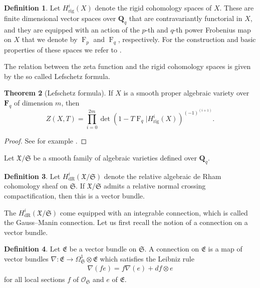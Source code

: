 \documentclass[a4paper,11pt]{article}
\numberwithin{equation}{section}
\newcommand{\QQ}{\mathbf{Q}} %
\newcommand{\FF}{\mathbf{F}} %
\DeclareMathOperator{\Frob}{F}           %
\providecommand{\HdR}{H_{\text{dR}}}    %
\providecommand{\Hrig}{H_{\text{rig}}}  %
\theoremstyle{definition}
\newtheorem{thm}{Theorem}[section]
\newtheorem{defn}[thm]{Definition}
\begin{document}
\begin{defn}
Let $\Hrig^{i}(X)$ denote the rigid
cohomology spaces of $X$. These are finite dimensional vector spaces over $\QQ_q$ 
that are contravariantly functorial in $X$, and they are equipped with an action of 
the $p$-th and $q$-th power Frobenius map on $X$ that we denote by $\Frob_p$ 
and $\Frob_q$, respectively. For the construction and basic properties of these spaces we 
refer to \cite{Berthelot1986}.
\end{defn}

The relation between the zeta function and the rigid cohomology spaces is given by the
so called Lefschetz formula.

\begin{thm}[Lefschetz formula] If $X$ is a smooth proper algebraic variety over $\FF_q$ of dimension $m$, 
then \label{thm:Lefschetz}
\[
Z(X,T) = \prod_{i=0}^{2m} \det(1- T \Frob_q | \Hrig^i(X))^{(-1)^{(i+1)}}.
\]
\end{thm}

\begin{proof}
See for example \cite[Theorem 6.3]{EtesseLeStum1993}.
\end{proof}

Let $\mathfrak{X}/\mathfrak{S}$ be a smooth family of algebraic varieties defined over $\QQ_q$.

\begin{defn}
Let $\HdR^i(\mathfrak{X}/\mathfrak{S})$ denote the relative algebraic de Rham cohomology sheaf  
on $\mathfrak{S}$. 
If $\mathfrak{X}/\mathfrak{S}$ admits a relative normal crossing compactification, then 
this is a vector bundle.
\end{defn}

The $\HdR^i(\mathfrak{X}/\mathfrak{S})$ come equipped with an integrable connection, which is called
the Gauss--Manin connection. Let us first recall the notion of a connection on a vector bundle.

\begin{defn}
Let $\mathfrak{E}$ be a vector bundle on $\mathfrak{S}$. A connection on $\mathfrak{E}$ is a map of vector bundles
$\nabla: \mathfrak{E} \rightarrow \Omega^1_{\mathfrak{S}} \otimes \mathfrak{E}$
which satisfies the Leibniz rule
\begin{align*}
\nabla(f e)=f\nabla(e)+df \otimes e
\end{align*} 
for all local sections $f$ of $\mathcal{O}_{\mathfrak{S}}$ and $e$ of $\mathfrak{E}$. 
\end{defn}
\end{document}
